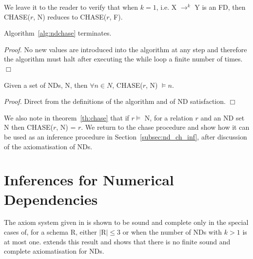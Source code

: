 We leave it to the reader to verify that when $k = 1$, i.e. X $\to^k$ Y is an
FD, then CHASE($r$, N) reduces to CHASE($r$, F).


\begin{lemma}\label{th:algterm}
\begin{rm}
Algorithm~\ref{alg:ndchase} terminates.
\end{rm}
\end{lemma}

{\em Proof.} No new values are introduced into the algorithm at any
step and therefore the algorithm must halt after executing the while
loop a finite number of times. $\Box$

\begin{theorem}\label{th:chase}
\begin{rm}
Given a set of NDs, N, then $\forall n \in N$, CHASE($r$, N) $\models n$.
\end{rm}
\end{theorem}

{\em Proof.} Direct from the definitions of the algorithm and of ND
satisfaction. $\Box$

We also note in theorem~\ref{th:chase} that if $r \models$ N, for a
relation $r$ and an ND set N then \linebreak CHASE($r$, N) = $r$.
We return to the chase procedure and show how it can be used as an
inference procedure in Section~\ref{subsec:nd_ch_inf}, after discussion of the
axiomatisation of NDs.   

\section{Inferences for Numerical Dependencies}\label{sec:nd_inf}

The axiom system given in \cite{gm85a} is shown to be sound and
complete only in the special cases of, for a schema R, either $|$R$| \le 3$ or when the number of
NDs with $k > 1$ is at most one. \cite{gm85b} extends this result
and shows that there is no finite sound and complete
axiomatisation for NDs. 

